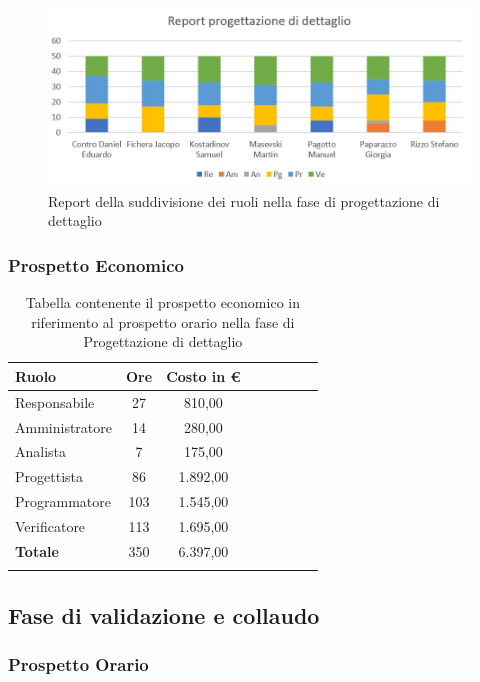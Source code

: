\documentclass[../piano_di_progetto.tex]{subfiles}
\begin{document}
\begin{figure}[H]
\centering
\includegraphics[width=12cm]{img/report_prog_dett}
\caption{Report della suddivisione dei ruoli nella fase di progettazione di dettaglio}
\end{figure}

\subsubsection{Prospetto Economico}

\begin{center}
	\begin{longtable}{|l|c|c|c|c|c|c|c|}
		\hline
		\rowcolor{lightgray}
		\textbf{Ruolo} & \textbf{Ore} & \textbf{Costo in €}\\

		\hline
		Responsabile & 27 & 810,00\\
		\hline
		Amministratore & 14 & 280,00\\
		\hline
		Analista & 7 & 175,00\\
		\hline
		Progettista & 86 & 1.892,00\\
		\hline
		Programmatore & 103 & 1.545,00\\
		\hline
		Verificatore & 113 & 1.695,00\\
		\hline
		\textbf{Totale} & 350 & 6.397,00\\
		\hline
		\caption{Tabella contenente il prospetto economico in riferimento al prospetto orario nella fase di Progettazione di dettaglio}
	\end{longtable}
\end{center}

\subsection{ Fase di validazione e collaudo}%
\label{sub:fase_valid_collaudo}
\subsubsection{Prospetto Orario}
\end{document}
